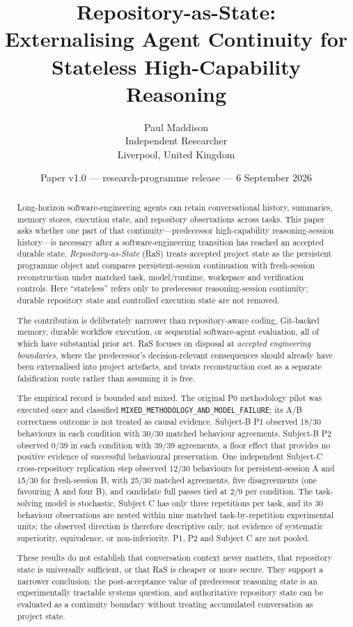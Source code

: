 \documentclass[11pt]{article}
\title{Repository-as-State:\\Externalising Agent Continuity for Stateless High-Capability Reasoning}
\author{Paul Maddison\\Independent Researcher\\Liverpool, United Kingdom}
\date{Paper v1.0 --- research-programme release --- 6 September 2026}
\newcommand{\mixedstatus}{\texttt{MIXED\_\allowbreak METHODOLOGY\_\allowbreak AND\_\allowbreak MODEL\_\allowbreak FAILURE}}
\begin{document}
\maketitle

\begin{abstract}
Long-horizon software-engineering agents can retain conversational history, summaries, memory stores, execution state, and repository observations across tasks. This paper asks whether one part of that continuity---predecessor high-capability reasoning-session history---is necessary after a software-engineering transition has reached an accepted durable state. \emph{Repository-as-State} (RaS) treats accepted project state as the persistent programme object and compares persistent-session continuation with fresh-session reconstruction under matched task, model/runtime, workspace and verification controls. Here ``stateless'' refers only to predecessor reasoning-session continuity; durable repository state and controlled execution state are not removed.

The contribution is deliberately narrower than repository-aware coding, Git-backed memory, durable workflow execution, or sequential software-agent evaluation, all of which have substantial prior art. RaS focuses on disposal at \emph{accepted engineering boundaries}, where the predecessor's decision-relevant consequences should already have been externalised into project artefacts, and treats reconstruction cost as a separate falsification route rather than assuming it is free.

The empirical record is bounded and mixed. The original P0 methodology pilot was executed once and classified \mixedstatus; its A/B correctness outcome is not treated as causal evidence. Subject-B P1 observed 18/30 behaviours in each condition with 30/30 matched behaviour agreements. Subject-B P2 observed 0/39 in each condition with 39/39 agreements, a floor effect that provides no positive evidence of successful behavioural preservation. One independent Subject-C cross-repository replication step observed 12/30 behaviours for persistent-session A and 15/30 for fresh-session B, with 25/30 matched agreements, five disagreements (one favouring A and four B), and candidate full passes tied at 2/9 per condition. The task-solving model is stochastic, Subject C has only three repetitions per task, and its 30 behaviour observations are nested within nine matched task-by-repetition experimental units; the observed direction is therefore descriptive only, not evidence of systematic superiority, equivalence, or non-inferiority. P1, P2 and Subject C are not pooled.

These results do not establish that conversation context never matters, that repository state is universally sufficient, or that RaS is cheaper or more secure. They support a narrower conclusion: the post-acceptance value of predecessor reasoning state is an experimentally tractable systems question, and authoritative repository state can be evaluated as a continuity boundary without treating accumulated conversation as project state.
\end{abstract}
\end{document}
